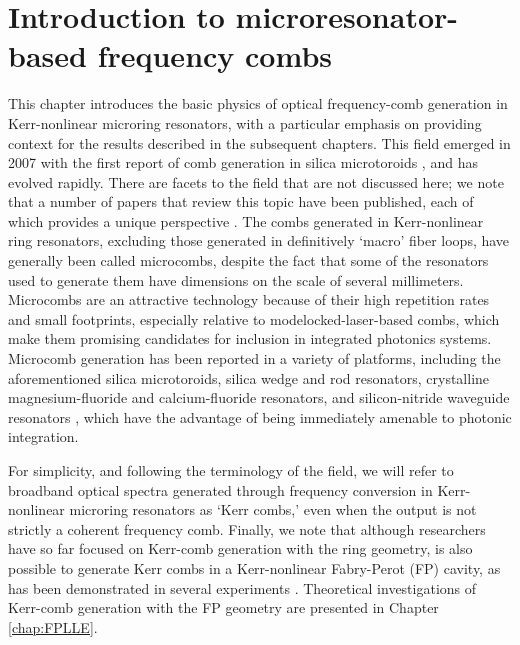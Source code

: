 \chapter{Introduction to microresonator-based frequency combs}
 \label{chap:microresonators}

 
 This chapter introduces the basic physics of optical frequency-comb generation in Kerr-nonlinear microring resonators, with a particular emphasis on providing context for the results described in the subsequent chapters. This field emerged in 2007 with the first report of comb generation in silica microtoroids \cite{DelHaye2007}, and has evolved rapidly. There are facets to the field that are not discussed here; we note that a number of papers that review this topic have been published, each of which provides a unique perspective \cite{Kippenberg2011,Savchenkov2016,Chembo2016a,Pasquazi2018}. The combs generated in Kerr-nonlinear ring resonators, excluding those generated in definitively `macro' fiber loops, have generally been called microcombs, despite the fact that some of the resonators used to generate them have dimensions on the scale of several millimeters. Microcombs are an attractive technology because of their high repetition rates and small footprints, especially relative to modelocked-laser-based combs, which make them promising candidates for inclusion in integrated photonics systems. Microcomb generation has been reported in a variety of platforms, including the aforementioned silica microtoroids, silica wedge \cite{Lee2012,Yi2015} and rod \cite{DelHaye2013} resonators, crystalline magnesium-fluoride \cite{Liang2011} and calcium-fluoride \cite{Savchenkov2008} resonators, and silicon-nitride waveguide resonators \cite{Okawachi2011,Moss2013}, which have the advantage of being immediately amenable to photonic integration.
 
 For simplicity, and following the terminology of the field, we will refer to broadband optical spectra generated through frequency conversion in Kerr-nonlinear microring resonators as `Kerr combs,' even when the output is not strictly a coherent frequency comb. Finally, we note that although researchers have so far focused on Kerr-comb generation with the ring geometry, is also possible to generate Kerr combs in a Kerr-nonlinear Fabry-Perot (FP) cavity, as has been demonstrated in several experiments \cite{Braje2009,Obrzud2017}. Theoretical investigations of Kerr-comb generation with the FP geometry are presented in Chapter \ref{chap:FPLLE}.
 

